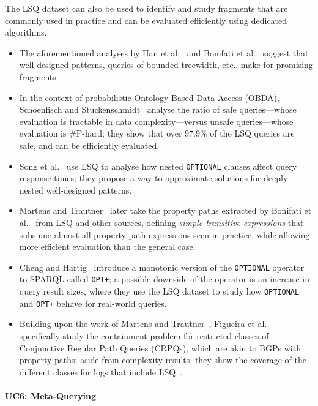 The LSQ dataset can also be used to identify and study fragments that are commonly used in practice and can be evaluated efficiently using dedicated algorithms. 
\begin{itemize}
\item The aforementioned analyses by Han et al.~\cite{han2016statistical} and Bonifati et al.~\cite{BonifatiMT17,bonifati2018darql} suggest that well-designed patterns, queries of bounded treewidth, etc., make for promising fragments. 
\item In the context of probabilistic Ontology-Based Data Access (OBDA), Schoenfisch and Stuckenschmidt~\cite{schoenfisch2016analyzing} analyse the ratio of safe queries---whose evaluation is tractable in data complexity---versus unsafe queries---whose evaluation is $\#$P-hard; they show that over 97.9\% of the LSQ queries are safe, and can be efficiently evaluated.
\item Song et al.~\cite{song2016efficient} use LSQ to analyse how nested \texttt{OPTIONAL} clauses affect query response times; they propose a way to approximate solutions for deeply-nested well-designed patterns.
\item Martens and Trautner~\cite{MartensT18} later take the property paths extracted by Bonifati et al.~\cite{BonifatiMT17} from LSQ and other sources, defining \textit{simple transitive expressions} that subsume almost all property path expressions seen in practice, while allowing more efficient evaluation than the general case. 
\item Cheng and Hartig~\cite{cheng2019opt+} introduce a monotonic version of the \texttt{OPTIONAL} operator to SPARQL called \texttt{OPT+}; a possible downside of the operator is an increase in query result sizes, where they use the LSQ dataset to study how \texttt{OPTIONAL} and \texttt{OPT+} behave for real-world queries.
\item Building upon the work of Martens and Trautner~\cite{MartensT18}, Figueira et al.~\cite{FigueiraGKMNT20} specifically study the containment problem for restricted classes of Conjunctive Regular Path Queries (CRPQs), which are akin to BGPs with property paths; aside from complexity results, they show the coverage of the different classes for logs that include LSQ~\cite{BonifatiMT20}.
\end{itemize}



\paragraph{UC6: Meta-Querying}
\label{sec-metaquerying_uc}

